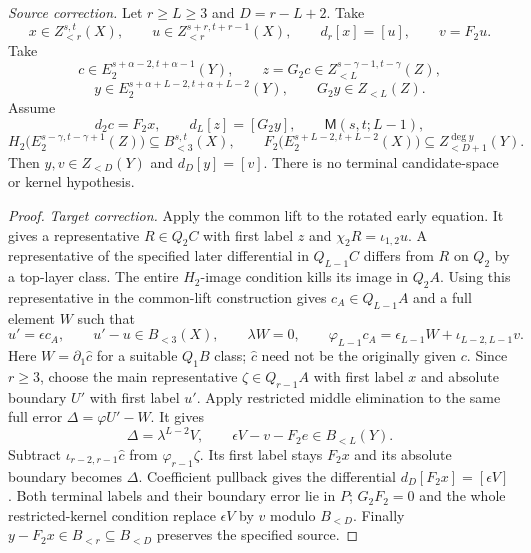 \begin{corollary}
\textit{Source correction.}
Let $r\ge L\ge3$ and $D=r-L+2$. Take
\[
x\in Z_{<r}^{s,t}(X),\qquad
u\in Z_{<r}^{s+r,t+r-1}(X),\qquad d_r[x]=[u],\qquad v=F_2u.
\]
Take
\[
c\in E_2^{s+\alpha-2,t+\alpha-1}(Y),\qquad
z=G_2c\in Z_{<L}^{s-\gamma-1,t-\gamma}(Z),
\]
\[
y\in E_2^{s+\alpha+L-2,t+\alpha+L-2}(Y),\qquad
G_2y\in Z_{<L}(Z).
\]
Assume
\[
d_2c=F_2x,\qquad d_L[z]=[G_2y],\qquad \mathsf M(s,t;L-1),
\]
\[
H_2\bigl(E_2^{s-\gamma,t-\gamma+1}(Z)\bigr)
 \subseteq B_{<3}^{s,t}(X),\qquad
F_2\bigl(E_2^{s+L-2,t+L-2}(X)\bigr)
 \subseteq Z_{<D+1}^{\deg y}(Y).
\]
Then $y,v\in Z_{<D}(Y)$ and $d_D[y]=[v]$.
There is no terminal candidate-space or kernel hypothesis.
\end{corollary}
\begin{proof}
\textit{Target correction.}
Apply the common lift to the rotated early equation. It gives a
representative $R\in Q_2C$ with first label $z$ and
$\chi_2R=\iota_{1,2}u$. A representative of the specified later
differential in $Q_{L-1}C$ differs from $R$ on $Q_2$ by a top-layer
class. The entire $H_2$-image condition kills its image in $Q_2A$.
Using this representative in the common-lift construction gives
$c_A\in Q_{L-1}A$ and a full element $W$ such that
\[
u'=\epsilon c_A,\qquad u'-u\in B_{<3}(X),\qquad
\lambda W=0,\qquad
\varphi_{L-1}c_A=\epsilon_{L-1}W+\iota_{L-2,L-1}v.
\]
Here $W=\partial_1\widehat c$ for a suitable $Q_1B$ class;
$\widehat c$ need not be the originally given $c$.
Since $r\ge3$, choose the main representative $\zeta\in Q_{r-1}A$
with first label $x$ and absolute boundary $U'$ with first label $u'$.
Apply restricted middle elimination to the same full error
$\Delta=\varphi U'-W$. It gives
\[
\Delta=\lambda^{L-2}V,\qquad
\epsilon V-v-F_2e\in B_{<L}(Y).
\]
Subtract $\iota_{r-2,r-1}\widehat c$ from
$\varphi_{r-1}\zeta$. Its first label stays $F_2x$ and its absolute
boundary becomes $\Delta$. Coefficient pullback gives the differential
$d_D[F_2x]=[\epsilon V]$. Both terminal labels and their boundary
error lie in $P$; $G_2F_2=0$ and the whole restricted-kernel condition
replace $\epsilon V$ by $v$ modulo $B_{<D}$. Finally
$y-F_2x\in B_{<r}\subseteq B_{<D}$ preserves the specified source.


\end{proof}
